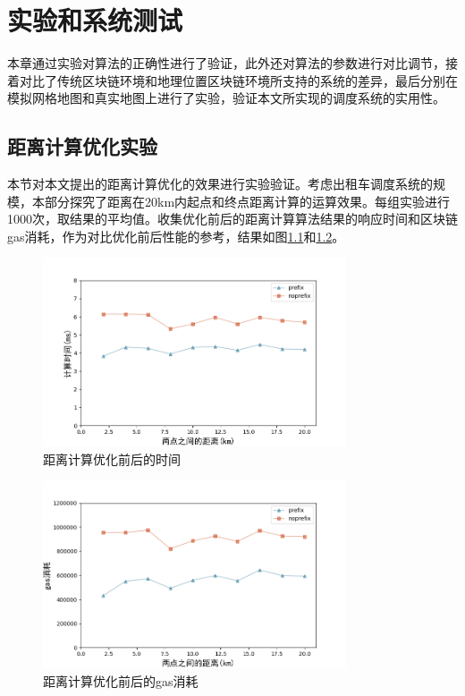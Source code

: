 \chapter{实验和系统测试}
本章通过实验对算法的正确性进行了验证，此外还对算法的参数进行对比调节，接着对比了传统区块链环境和地理位置区块链环境所支持的系统的差异，最后分别在模拟网格地图和真实地图上进行了实验，验证本文所实现的调度系统的实用性。

\section{距离计算优化实验}
本节对本文提出的距离计算优化的效果进行实验验证。考虑出租车调度系统的规模，本部分探究了距离在20km内起点和终点距离计算的运算效果。每组实验进行1000次，取结果的平均值。收集优化前后的距离计算算法结果的响应时间和区块链gas消耗，作为对比优化前后性能的参考，结果如图\ref{fig:betterDistance}和\ref{fig:betterGas}。

\begin{figure}[h]
  \centering
  \includegraphics[height=0.3\textheight,width=0.8\textwidth]{figures/距离计算优化时间}
  \caption{距离计算优化前后的时间}\label{fig:betterDistance}
\end{figure}

\begin{figure}[h]
  \centering
  \includegraphics[height=0.3\textheight,width=0.8\textwidth]{figures/距离计算优化gas}
  \caption{距离计算优化前后的gas消耗}\label{fig:betterGas}
\end{figure}

